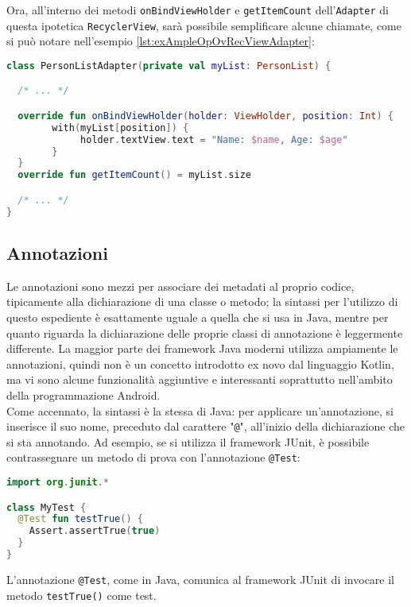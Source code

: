 Ora, all'interno dei metodi \texttt{onBindViewHolder} e \texttt{getItemCount} dell'\texttt{Adapter} di questa ipotetica \texttt{RecyclerView}, sarà possibile semplificare alcune chiamate, come si può notare nell'esempio \ref{lst:exAmpleOpOvRecViewAdapter}:\\

\begin{lstlisting}[caption={Utilizzo degli operatori in un \texttt{Adapter}}, captionpos=b, label={lst:exAmpleOpOvRecViewAdapter}, language=Kotlin]
class PersonListAdapter(private val myList: PersonList) {

  /* ... */

  override fun onBindViewHolder(holder: ViewHolder, position: Int) {
      	with(myList[position]) {
	         holder.textView.text = "Name: $name, Age: $age"
        }
  }
  override fun getItemCount() = myList.size

  /* ... */
}
\end{lstlisting}

\subsection{Annotazioni}
Le annotazioni sono mezzi per associare dei metadati al proprio codice, tipicamente alla dichiarazione di una classe o metodo; la sintassi per l'utilizzo di questo espediente è esattamente uguale a quella che si usa in Java, mentre per quanto riguarda la dichiarazione delle proprie classi di annotazione è leggermente differente. La maggior parte dei framework Java moderni utilizza ampiamente le annotazioni, quindi non è un concetto introdotto ex novo dal linguaggio Kotlin, ma vi sono alcune funzionalità aggiuntive e interessanti soprattutto nell'ambito della programmazione Android.\\
Come accennato, la sintassi è la stessa di Java: per applicare un'annotazione, si inserisce il suo nome, preceduto dal carattere "\texttt{@}", all'inizio della dichiarazione che si sta annotando. Ad esempio, se si utilizza il framework JUnit, è possibile contrassegnare un metodo di prova con l'annotazione \texttt{@Test}:\\

\begin{lstlisting}[caption={Annotazione di Test}, captionpos=b, label={lst:exAmpleAnnotTest}, language=Kotlin]
import org.junit.*

class MyTest {
  @Test fun testTrue() {
    Assert.assertTrue(true)
  }
}
\end{lstlisting}
L'annotazione \texttt{@Test}, come in Java, comunica al framework JUnit di invocare il metodo \texttt{testTrue()} come test.\\

